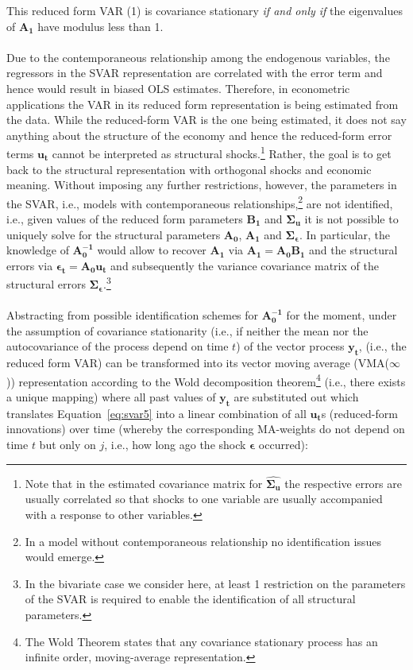 \documentclass[a4paper,11pt,listof=nochaptergap,oneside,pointednumbers,bibtotoc,bigheadings,liststotoc]{scrbook}
\let\oldhat\hat
\renewcommand{\hat}[1]{\oldhat{\bm{#1}}}
\newcommand{\vect}[1]{\boldsymbol{\mathbf{#1}}}
\begin{document}
This reduced form VAR (1) is covariance stationary \textit{if and only if} the eigenvalues of $\vect{A_1}$ have modulus less than 1. \\
\\
Due to the contemporaneous relationship among the endogenous variables, the regressors in the SVAR representation are correlated with the error term and hence would result in biased OLS estimates. Therefore, in econometric applications the VAR in its reduced form representation is being estimated from the data. While the reduced-form VAR is the one being estimated, it does not say anything about the structure of the economy and hence the reduced-form error terms $\vect{u_t}$ cannot be interpreted as structural shocks.\footnote{Note that in the estimated covariance matrix for $\hat{\Sigma_u}$ the respective errors are usually correlated so that shocks to one variable are usually accompanied with a response to other variables.} Rather, the goal is to get back to the structural representation with orthogonal shocks and economic meaning. Without imposing any further restrictions, however, the parameters in the SVAR, i.e., models with contemporaneous relationships,\footnote{In a model without contemporaneous relationship no identification issues would emerge.} are not identified, i.e., given values of the reduced form parameters $\vect{B_1}$ and $\vect{\Sigma_u}$ it is not possible to uniquely solve for the structural parameters $\vect{A_0}$, $\vect{A_1}$ and $\vect{\Sigma_\epsilon}$. In particular, the knowledge of $\vect{A_0^{-1}}$ would allow to recover $\vect{A_1}$ via $\vect{A_1} = \vect{A_0}\vect{B_1}$ and the structural errors via $\vect{\epsilon_t} = \vect{A_0}\vect{u_t}$ and subsequently the variance covariance matrix of the structural errors $\vect{\Sigma_\epsilon}$.\footnote{In the bivariate case we consider here, at least 1 restriction on the parameters of the SVAR is required to enable the identification of all structural parameters. }\\
\\
Abstracting from possible identification schemes for $\vect{A_0^{-1}}$ for the moment, under the assumption of covariance stationarity (i.e., if neither the mean nor the autocovariance of the process depend on time $t$) of the vector process $\vect{y_t}$, \vect{y_t} (i.e., the reduced form VAR) can be transformed into its vector moving average (VMA($\infty$)) representation according to the Wold decomposition theorem\footnote{The Wold Theorem states that any covariance stationary process has an infinite order, moving-average representation.} (i.e., there exists a unique mapping) where all past values of $\vect{y_t}$ are substituted out which translates Equation~\ref{eq:svar5} into a linear combination of all $\vect{u_t}$s (reduced-form innovations) over time (whereby the corresponding MA-weights do not depend on time $t$ but only on $j$, i.e., how long ago the shock $\vect{\epsilon}$ occurred):
\end{document}
